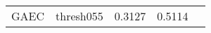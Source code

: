 \begin{table*}
\begin{subtable}[t!]{0.98\textwidth}
\begin{tabular}{c| c| c | c | c}
GAEC & thresh055  & {\color{Orange} 0.3127 } & {\color{Orange} 0.5114 } \\

\end{tabular}
\end{subtable}
\end{table*}
